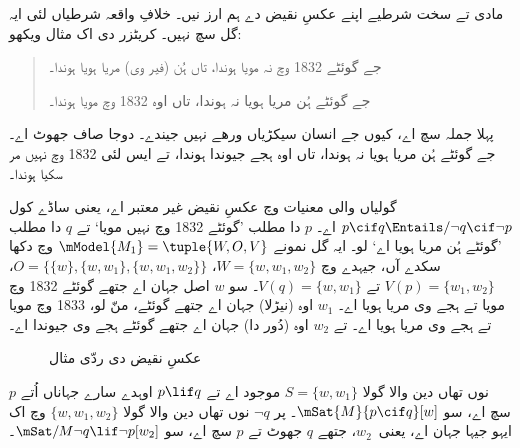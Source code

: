 \documentclass[../../../include/open-logic-section]{subfiles}
\begin{document}


مادی تے سخت شرطیے اپنے عکسِ نقیض دے ہم ارز نیں۔ خلافِ واقعہ شرطیاں لئی
ایہ گل سچ نہیں۔ کریٹزر دی اک مثال ویکھو:
\begin{quote}
  جے گوئٹے 1832 وچ نہ مویا ہوندا، تاں ہُن (فیر وی) مریا ہویا ہوندا۔

  جے گوئٹے ہُن مریا ہویا نہ ہوندا، تاں اوہ 1832 وچ مویا ہوندا۔
\end{quote}
پہلا جملہ سچ اے، کیوں جے انسان سیکڑیاں ورھے نہیں جیندے۔ دوجا صاف جھوٹ اے۔
جے گوئٹے ہُن مریا ہویا نہ ہوندا، تاں اوہ ہجے جیوندا ہوندا، تے ایس لئی
1832 وچ نہیں مر سکیا ہوندا۔

\begin{ex}
  گولیاں والی معنیات وچ عکسِ نقیض غیر معتبر اے، یعنی ساڈے کول $p
  \cif q \Entails/ \lnot q \cif \lnot p$ اے۔ $p$ دا مطلب ’گوئٹے
  1832 وچ نہیں مویا‘ تے $q$ دا مطلب ’گوئٹے ہُن مریا ہویا اے‘ لو۔
  ایہ گل نمونے $\mModel{M_1} = \tuple{W, O, V}$ وچ دکھا سکدے آں، جیہدے وچ
  $W = \{w, w_1, w_2\}$، $O = \{\{w\}, \{w, w_1\}, \{w, w_1, w_2\}\}$،
  $V(p) = \{w_1, w_2\}$ تے $V(q) = \{w, w_1\}$۔ سو $w$ اصل جہان اے
  جتھے گوئٹے 1832 وچ مویا تے ہجے وی مریا ہویا اے۔ $w_1$ اوہ (نیڑلا)
  جہان اے جتھے گوئٹے، منّ لو، 1833 وچ مویا تے ہجے وی مریا ہویا اے۔
  تے $w_2$ اوہ (دُور دا) جہان اے جتھے گوئٹے ہجے وی جیوندا اے۔
\begin{figure}
\begin{center}
\caption{عکسِ نقیض دی ردّی مثال}
\end{center}
\end{figure}
$p$ نوں تھاں دین والا گولا $S = \{w, w_1\}$ موجود اے تے $p \lif q$
اوہدے سارے جہاناں اُتے سچ اے، سو $\mSat{M}{p \cif q}[w]$۔ پر $\lnot q$
نوں تھاں دین والا گولا $\{w, w_1, w_2\}$ وچ اک ایہو جیہا جہان اے،
یعنی~$w_2$، جتھے $q$ جھوٹ تے $p$ سچ اے، سو $\mSat/{M}{\lnot q \lif \lnot p}[w_2]$۔
\end{ex}
\end{document}
